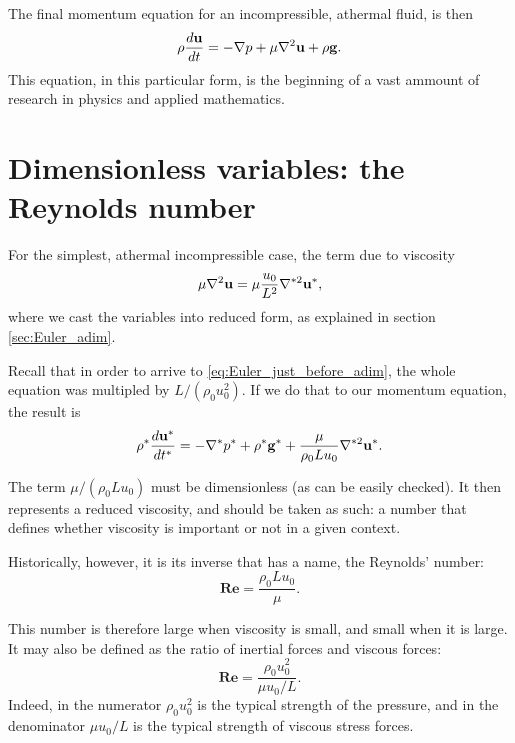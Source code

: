 The final momentum equation for an incompressible, athermal fluid, is then
\[
\rho \frac{d\mathbf{u} }{dt} =
- \nabla p 
+ \mu \nabla^2 \mathbf{u}
+ \rho \mathbf{g} .
\]
This equation, in this particular form, is the beginning of a vast
ammount of research in physics and applied mathematics.



\section{Dimensionless variables: the Reynolds number}

For the simplest, athermal
incompressible case, the term due to viscosity
\[
\mu \nabla^2 \mathbf{u} = \mu \frac{u_0}{L^2} \nabla^{*2} \mathbf{u}^* ,
\]
where we cast the variables into reduced form, as explained in
section \ref{sec:Euler_adim}.

Recall that in order to arrive to \ref{eq:Euler_just_before_adim}, the
whole equation was multipled by $L/(\rho_0 u_0^2)$. If we do that to our
momentum equation, the result is
\[
\rho^* \frac{d\mathbf{u}^* }{dt^* } =
-  \nabla^* p^*
+  \rho^* \mathbf{g}^* +
\frac{\mu }{\rho_ 0 L u_0 } \nabla^{*2} \mathbf{u}^* .
\]

The term $\mu /( \rho_ 0 L u_0)$ must be dimensionless (as can be
easily checked). It then represents a reduced viscosity, and should be
taken as such: a number that defines whether viscosity is important or
not in a given context.

Historically, however, it is its inverse that has a name, the
Reynolds' number:
\begin{equation}
  \mathbf{Re}= \frac{\rho_ 0 L u_0 }{\mu }.
\end{equation}

This number is therefore large when viscosity is small, and small when
it is large. It may also be defined as the ratio of inertial forces and
viscous forces:
\begin{equation}
  \mathbf{Re}= \frac{\rho_ 0 u^2_0 }{\mu u_0 / L }.
\end{equation}
Indeed, in the numerator $\rho_ 0 u^2_0$ is the typical strength of the
pressure, and in the denominator $\mu u_0 / L $ is the typical
strength of viscous stress forces.

